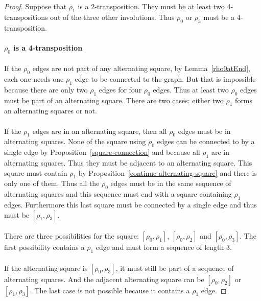 \begin{proof}
  Suppose that $\rho_1$ is a 2-transposition. They must be at least two 4-transpositions out of the three other involutions. Thus $\rho_0$ or $\rho_3$ must be a 4-transposition.

  \paragraph{}
  \textbf{$\rho_0$ is a 4-transposition}

  \paragraph{}
  If the $\rho_0$ edges are not part of any alternating square, by Lemma~\ref{rho0atEnd}, each one needs one $\rho_1$ edge to be connected to the graph. But that is impossible because there are only two $\rho_1$ edges for four $\rho_0$ edges. Thus at least two $\rho_0$ edges must be part of an alternating square. There are two cases: either two $\rho_1$ forms an alternating squares or not.

  \paragraph{}
  If the $\rho_1$ edges are in an alternating square, then all $\rho_0$ edges must be in alternating squares. None of the square using $\rho_0$ edges can be connected to by a single edge by Proposition~\ref{square-connection} and because all $\rho_1$ are in alternating squares. Thus they must be adjacent to an alternating square. This square must contain $\rho_1$ by Proposition~\ref{continue-alternating-square} and there is only one of them. Thus all the $\rho_0$ edges must be in the same sequence of alternating squares and this sequence must end with a square containing $\rho_1$ edges. Furthermore this last square must be connected by a single edge and thus must be $[\rho_1, \rho_3]$.

  \paragraph{}
  There are three possibilities for the square: $[\rho_0, \rho_1]$, $[\rho_0, \rho_2]$ and $[\rho_0, \rho_3]$. The first possibility contains a $\rho_1$ edge and must form a sequence of length 3.

  \paragraph{}
  If the alternating square is $[\rho_0, \rho_3]$, it must still be part of a sequence of alternating squares. And the adjacent alternating square can be $[\rho_0, \rho_2]$ or $[\rho_1, \rho_3]$. The last case is not possible because it contains a $\rho_1$ edge.


\end{proof}
